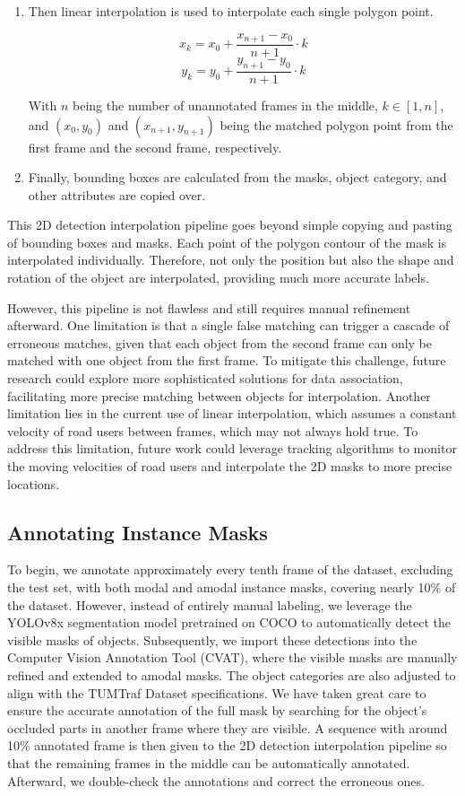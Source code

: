 \begin{enumerate}
	\item Then linear interpolation is used to interpolate each single polygon point. 
	
	\[
	x_k = x_0 + \frac{{x_{n + 1} - x_0}}{{n + 1}} \cdot k
	\]
	\[
	y_k = y_0 + \frac{{y_{n + 1} - y_0}}{{n + 1}} \cdot k
	\]
	
	With \(n\) being the number of unannotated frames in the middle, \(k \in [1, n]\), and \((x_0, y_0)\) and \((x_{n + 1}, y_{n + 1})\) being the matched polygon point from the first frame and the second frame, respectively.
	
	\item Finally, bounding boxes are calculated from the masks, object category, and other attributes are copied over.  
\end{enumerate}

This 2D detection interpolation pipeline goes beyond simple copying and pasting of bounding boxes and masks. Each point of the polygon contour of the mask is interpolated individually. Therefore, not only the position but also the shape and rotation of the object are interpolated, providing much more accurate labels. 

However, this pipeline is not flawless and still requires manual refinement afterward. One limitation is that a single false matching can trigger a cascade of erroneous matches, given that each object from the second frame can only be matched with one object from the first frame. To mitigate this challenge, future research could explore more sophisticated solutions for data association, facilitating more precise matching between objects for interpolation. Another limitation lies in the current use of linear interpolation, which assumes a constant velocity of road users between frames, which may not always hold true. To address this limitation, future work could leverage tracking algorithms to monitor the moving velocities of road users and interpolate the 2D masks to more precise locations.

\subsection{Annotating Instance Masks}  \label{sec:mask_annotation}

To begin, we annotate approximately every tenth frame of the dataset, excluding the test set, with both modal and amodal instance masks, covering nearly 10\% of the dataset. However, instead of entirely manual labeling, we leverage the YOLOv8x segmentation model pretrained on COCO to automatically detect the visible masks of objects. Subsequently, we import these detections into the Computer Vision Annotation Tool (CVAT), where the visible masks are manually refined and extended to amodal masks. The object categories are also adjusted to align with the TUMTraf Dataset specifications. We have taken great care to ensure the accurate annotation of the full mask by searching for the object's occluded parts in another frame where they are visible. A sequence with around 10\% annotated frame is then given to the 2D detection interpolation pipeline so that the remaining frames in the middle can be automatically annotated. Afterward, we double-check the annotations and correct the erroneous ones. 

